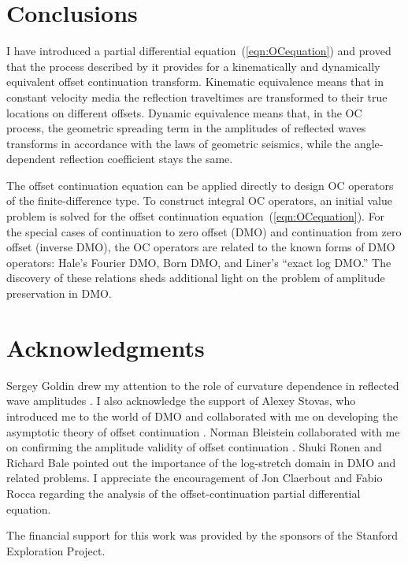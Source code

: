\section{Conclusions}
I have introduced a partial differential
equation~(\ref{eqn:OCequation}) and proved that the process described
by it provides for a kinematically and dynamically equivalent offset
continuation transform. Kinematic equivalence means that in constant
velocity media the reflection traveltimes are transformed to their
true locations on different offsets. Dynamic equivalence means that,
in the OC process, the geometric spreading term in the amplitudes of
reflected waves transforms in accordance with the laws of geometric
seismics, while the angle-dependent reflection coefficient stays the
same.
  
The offset continuation equation can be applied directly to design OC
operators of the finite-difference type. To construct integral OC
operators, an initial value problem is solved for the
offset continuation equation~(\ref{eqn:OCequation}). For the special
cases of continuation to zero offset (DMO) and continuation from zero
offset (inverse DMO), the OC operators are related to the known forms
of DMO operators: Hale's Fourier DMO, Born DMO, and Liner's ``exact
log DMO.'' The discovery of these relations sheds additional light on
the problem of amplitude preservation in DMO.

\section{Acknowledgments}
Sergey Goldin drew my attention to the role of curvature dependence in
reflected wave amplitudes \cite[]{joint}.  I also acknowledge the
support of Alexey Stovas, who introduced me to the world of DMO and
collaborated with me on developing the asymptotic theory of offset
continuation \cite[]{stovas}. Norman Bleistein collaborated with me on 
confirming the amplitude validity of offset continuation
\cite[]{SEG-1996-1731,menorm}. Shuki Ronen and Richard Bale
pointed out the importance of the log-stretch domain in DMO and
related problems.  I appreciate the encouragement of Jon Claerbout and
Fabio Rocca regarding the analysis of the offset-continuation partial
differential equation.

The financial support for this work was provided by the sponsors of
the Stanford Exploration Project.









